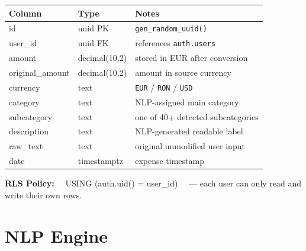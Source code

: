 \documentclass[a4paper,10pt]{article}
\begin{document}
\begin{tcolorbox}[databox]
{\small
\begin{tabular}{@{}lll@{}}
  \toprule
  {\color{ncyan}Column} & {\color{ncyan}Type} & {\color{ncyan}Notes} \\
  \midrule
  {\color{ngreen}\ttfamily id}
    & {\color{tm}\ttfamily uuid PK}
    & \texttt{gen\_random\_uuid()} \\
  {\color{ngreen}\ttfamily user\_id}
    & {\color{tm}\ttfamily uuid FK}
    & references \texttt{auth.users} \\
  {\color{tw}\ttfamily amount}
    & {\color{tm}\ttfamily decimal(10,2)}
    & stored in EUR after conversion \\
  {\color{tw}\ttfamily original\_amount}
    & {\color{tm}\ttfamily decimal(10,2)}
    & amount in source currency \\
  {\color{tw}\ttfamily currency}
    & {\color{tm}\ttfamily text}
    & \texttt{EUR} / \texttt{RON} / \texttt{USD} \\
  {\color{tw}\ttfamily category}
    & {\color{tm}\ttfamily text}
    & NLP-assigned main category \\
  {\color{tw}\ttfamily subcategory}
    & {\color{tm}\ttfamily text}
    & one of 40+ detected subcategories \\
  {\color{tw}\ttfamily description}
    & {\color{tm}\ttfamily text}
    & NLP-generated readable label \\
  {\color{tw}\ttfamily raw\_text}
    & {\color{tm}\ttfamily text}
    & original unmodified user input \\
  {\color{tw}\ttfamily date}
    & {\color{tm}\ttfamily timestamptz}
    & expense timestamp \\
  \bottomrule
\end{tabular}
}
\vspace{4pt}

{\color{ngreen}\small\bfseries RLS Policy:}~~
{\color{tm}\small\ttfamily USING (auth.uid() = user\_id)}~~
{\color{tm}\small --- each user can only read and write their own rows.}
\end{tcolorbox}

\newpage

\thispagestyle{empty}

\section{NLP Engine}
\end{document}
